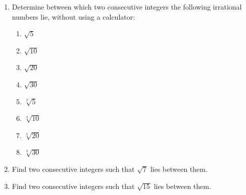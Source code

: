 \begin{eocexercises}{}
\begin{enumerate}[itemsep=5pt, label=\textbf{\arabic*}. ]
\item Determine between which two consecutive integers the following irrational numbers lie, without using a calculator:
    \begin{enumerate}[itemsep=5pt, label=\textbf{\alph*}. ] 
    \item $\sqrt{5}$ 
    \item $\sqrt{10}$ 
    \item $\sqrt{20}$ 
    \item $\sqrt{30}$ 
    \item $\sqrt[3]{5}$ 
    \item $\sqrt[3]{10}$ 
    \item $\sqrt[3]{20}$ 
    \item $\sqrt[3]{30}$ 
    \end{enumerate}
\item  Find two consecutive integers such that $\sqrt{7}$ lies between them.          
\item  Find two consecutive integers such that $\sqrt{15}$ lies between them.          





\end{enumerate}
\end{eocexercises}
